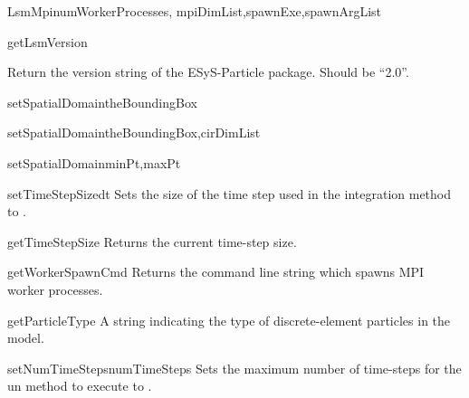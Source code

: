 \documentclass{manual}
\begin{document}
\begin{classdesc}{LsmMpi}{numWorkerProcesses, mpiDimList,spawnExe,spawnArgList}
\begin{methoddesc}{getLsmVersion}{}

Return the version string of the ESyS-Particle package. Should be ``2.0''.
\end{methoddesc}

\begin{methoddesc}{setSpatialDomain}{theBoundingBox}
\end{methoddesc}

\begin{methoddesc}{setSpatialDomain}{theBoundingBox,cirDimList}
\end{methoddesc}

\begin{methoddesc}{setSpatialDomain}{minPt,maxPt}
\end{methoddesc}

\begin{methoddesc}{setTimeStepSize}{dt}
Sets the size of the time step used in the integration method to .
\end{methoddesc}

\begin{methoddesc}{getTimeStepSize}{}
Returns the current time-step size.
\end{methoddesc}

\begin{methoddesc}{getWorkerSpawnCmd}{}
Returns the command line string which spawns MPI worker processes.
\end{methoddesc}

\begin{methoddesc}{getParticleType}{}
A string indicating the type of discrete-element particles in the model.
\end{methoddesc}

\begin{methoddesc}{setNumTimeSteps}{numTimeSteps}
Sets the maximum number of time-steps for the {\sf un} method to execute to . 
\end{methoddesc}


\end{classdesc}
\end{document}
